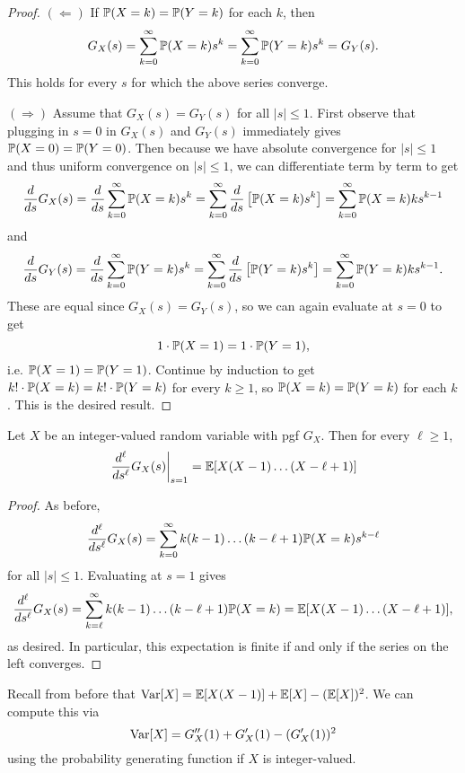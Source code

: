 \begin{proof}
  $(\Leftarrow)$ If $\mathbb{P}(X = k) = \mathbb{P}(Y = k)$ for
  each $k$, then
  \[
    G_X(s)
    = \sum_{k = 0}^\infty \mathbb{P}(X = k) s^k
    = \sum_{k = 0}^\infty \mathbb{P}(Y = k) s^k
    = G_Y(s).
  \]
  This holds for every $s$ for which the above series
  converge.

  $(\Rightarrow)$ Assume that
  $G_X(s) = G_Y(s)$ for all
  $|s| \le 1$. First observe that
  plugging in $s = 0$ in $G_X(s)$
  and $G_Y(s)$ immediately
  gives $\mathbb{P}(X = 0) = \mathbb{P}(Y = 0)$. Then
  because we have absolute convergence
  for $|s| \le 1$ and thus uniform convergence
  on $|s| \le 1$, we can differentiate
  term by term to get
  \[
    \frac{d}{ds} G_X(s)
    = \frac{d}{ds} \sum_{k = 0}^\infty \mathbb{P}(X = k) s^k
    = \sum_{k = 0}^\infty \frac{d}{ds} \left[\mathbb{P}(X = k) s^k\right]
    = \sum_{k = 0}^\infty \mathbb{P}(X = k) k s^{k - 1}
  \]
  and
  \[
    \frac{d}{ds} G_Y(s)
    = \frac{d}{ds} \sum_{k = 0}^\infty \mathbb{P}(Y = k) s^k
    = \sum_{k = 0}^\infty \frac{d}{ds} \left[\mathbb{P}(Y = k) s^k\right]
    = \sum_{k = 0}^\infty \mathbb{P}(Y = k) k s^{k - 1}.
  \]
  These are equal since $G_X(s) = G_Y(s)$, so
  we can again evaluate at $s = 0$ to get
  \[
    1 \cdot \mathbb{P}(X = 1) = 1 \cdot \mathbb{P}(Y = 1),
  \]
  i.e. $\mathbb{P}(X = 1) = \mathbb{P}(Y = 1)$. Continue
  by induction to get $k! \cdot \mathbb{P}(X = k) = k! \cdot \mathbb{P}(Y = k)$
  for every $k \ge 1$, so $\mathbb{P}(X = k) = \mathbb{P}(Y = k)$
  for each $k$. This is the desired result.
\end{proof}

\begin{theorem}
  Let $X$ be an integer-valued random variable
  with pgf $G_X$. Then for every
  $\ell \ge 1$,
  \[
    \left.\frac{d^\ell}{ds^\ell} G_X(s)\right|_{s = 1}
      = \mathbb{E}[X(X - 1) \dots (X - \ell + 1)]
  \]
\end{theorem}

\begin{proof}
  As before,
  \[
    \frac{d^\ell}{ds^\ell} G_X(s)
    = \sum_{k = 0}^\infty k(k - 1) \dots (k - \ell + 1)
    \mathbb{P}(X = k) s^{k - \ell}
  \]
  for all $|s| \le 1$. Evaluating at $s = 1$ gives
  \[
    \frac{d^\ell}{ds^\ell} G_X(s)
    = \sum_{k = \ell}^\infty k(k - 1) \dots (k - \ell + 1) \mathbb{P}(X = k)
    = \mathbb{E}[X(X - 1) \dots (X - \ell + 1)],
  \]
  as desired. In particular, this expectation
  is finite if and only if the series on the
  left converges.
\end{proof}

\begin{remark}
  Recall from before that
  $\operatorname{Var}[X] = \mathbb{E}[X(X - 1)] + \mathbb{E}[X] - (\mathbb{E}[X])^2$.
  We can compute this via
  \[
    \operatorname{Var}[X] = G_X''(1) + G_X'(1) - (G_X'(1))^2
  \]
  using the probability generating function if
  $X$ is integer-valued.
\end{remark}

